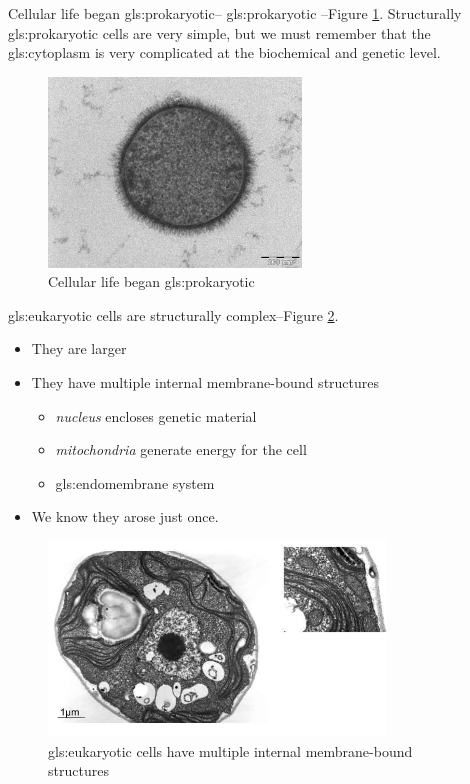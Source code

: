 \documentclass[]{article}
\begin{document}
Cellular life began \gls{gls:prokaryotic}-- \glsdesc{gls:prokaryotic}
--Figure \ref{fig:prokaryote}. Structurally \gls{gls:prokaryotic} cells are very simple, but we must remember that the \gls{gls:cytoplasm} is very complicated at the biochemical and genetic level.

\begin{figure}[H]
	\begin{center}
		\caption{Cellular life began \gls{gls:prokaryotic}}\label{fig:prokaryote}
		\includegraphics[width=0.6\textwidth]{prokaryote}
	\end{center}
\end{figure}

\Gls{gls:eukaryotic} cells are structurally complex--Figure \ref{fig:ManyMembranes}. 

\begin{itemize}
	\item They are larger
	\item They have multiple internal membrane-bound structures
	\begin{itemize}
		\item \emph{nucleus} encloses genetic material
		\item \emph{mitochondria} generate energy for the cell
		\item \gls{gls:endomembrane} system
	\end{itemize}
	\item We know they arose just once.
\end{itemize}

\begin{figure}[H]
	\caption[\Gls{gls:eukaryotic} cells: multiple internal membrane-bound structures]{\Gls{gls:eukaryotic} cells have multiple internal membrane-bound structures}\label{fig:ManyMembranes}
	\includegraphics[width=0.8\textwidth]{ManyMembranes}
\end{figure}
\end{document}
